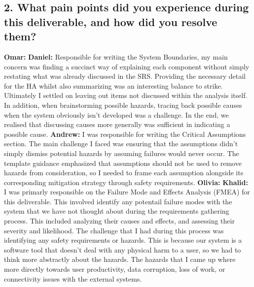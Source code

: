 \documentclass{article}
\begin{document}
\subsection*{2. What pain points did you experience during this deliverable, and how
did you resolve them?}
\bigskip
\textbf{Omar: }
\newline
\newline
\textbf{Daniel: } Responsible for writing the System Boundaries, my main concern was finding a succinct way of explaining each component without simply restating what was already discussed in the SRS. Providing the necessary detail for the HA whilst also summarizing was an interesting balance to strike. Ultimately I settled on leaving out items not discussed within the analysis itself. In addition, when brainstorming possible hazards, tracing back possible causes when the system obviously isn't developed was a challenge. In the end, we realised that discussing causes more generally was sufficient in indicating a possible cause.
\newline
\newline
\textbf{Andrew: } I was responsible for writing the Critical Assumptions section. The main challenge I faced was ensuring that the assumptions didn't simply dismiss potential hazards by assuming failures would never occur. The template guidance emphasized that assumptions should not be used to remove hazards from consideration, so I needed to frame each assumption alongside its corresponding mitigation strategy through safety requirements. 
\newline
\newline
\textbf{Olivia: }
\newline
\newline
\textbf{Khalid: } I was primarly responsible on the Failure Mode and Effects Analysis (FMEA) for this deliverable. This involved identify any potentail failure modes with the system that we have not thought about during the requirements gathering process. This included analyzing their causes and effects, and assessing their severity and likelihood. The challenge that I had during this process was identifying any safety requirements or hazards. This is because our system is a software tool that doesn't deal with any physical harm to a user, so we had to think more abstractly about the hazards. The hazards that I came up where more directly towards user productivity, data corruption, loss of work, or connectivity issues with the external systems.
\end{document}
